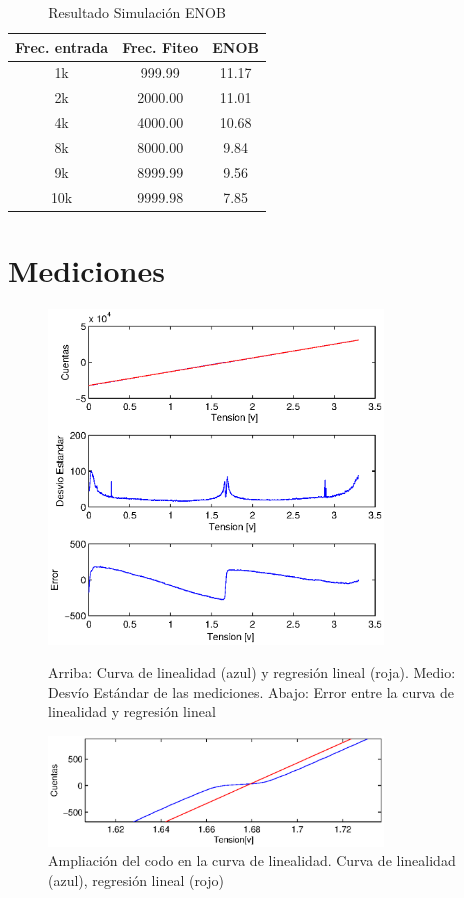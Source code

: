 \documentclass[a4paper,conference]{IEEEtran}
\begin{document}
\begin{table}[!h]
	\renewcommand{\arraystretch}{1.3}
	\caption{Resultado Simulaci\'on ENOB}
	\label{Tabla:sim}
	\centering
	\begin{tabular}{|c|c|c|}
		\hline
		Frec. entrada & Frec. Fiteo & ENOB\\
		\hline
		1k & 999.99 & 11.17\\
		\hline
		2k & 2000.00 & 11.01\\
		\hline
		4k & 4000.00 & 10.68\\
		\hline
		8k & 8000.00 & 9.84\\
		\hline
		9k & 8999.99 & 9.56\\
		\hline
		10k & 9999.98 & 7.85\\
		\hline
	\end{tabular}
\end{table}

\section{Mediciones}

\begin{figure}[!b]
\centering
\includegraphics[width=3.5in]{Linealidad}
\caption{Arriba: Curva de linealidad (azul) y regresión lineal (roja). Medio: Desvío Estándar de las mediciones. Abajo: Error entre la curva de linealidad y regresión lineal}

\label{fig:lin}
	\centering
	\includegraphics[width=3.5in]{Linealidad_codo}
	\caption{Ampliación del codo en la curva de linealidad. Curva de linealidad (azul), regresión lineal (rojo)}
	
	\label{fig:lincodo}
\end{figure}
\end{document}
